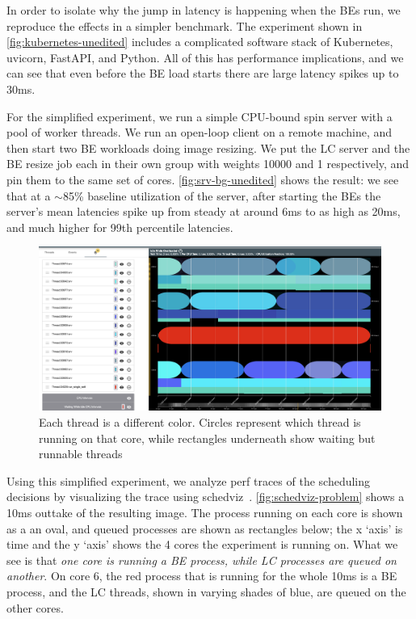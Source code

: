 In order to isolate why the jump in latency is happening when the BEs run, we
reproduce the effects in a simpler benchmark. The experiment shown in
\autoref{fig:kubernetes-unedited} includes a complicated software stack of
Kubernetes, uvicorn, FastAPI, and Python. All of this has performance
implications, and we can see that even before the BE load starts there are large
latency spikes up to 30ms.

For the simplified experiment, we run a simple CPU-bound spin server with a pool
of worker threads. We run an open-loop client on a remote machine, and then
start two BE workloads doing image resizing. We put the LC server and the BE
resize job each in their own \cgroups{} group with weights 10000 and 1
respectively, and pin them to the same set of cores.
\autoref{fig:srv-bg-unedited} shows the result: we see that at a $\sim$85\%
baseline utilization of the server, after starting the BEs the server's mean
latencies spike up from steady at around 6ms to as high as 20ms, and much higher
for 99th percentile latencies.

\begin{figure}[t]
    \centering
    \includegraphics[width=\columnwidth]{graphs/schedviz-problem.png}
    \caption{Each thread is a different color. Circles represent which
    thread is running on that core, while rectangles underneath show waiting but
    runnable threads
    }\label{fig:schedviz-problem}
\end{figure}

Using this simplified experiment, we analyze perf traces of the scheduling
decisions by visualizing the trace using schedviz~\cite{schedviz-tool}.
\autoref{fig:schedviz-problem} shows a 10ms outtake of the resulting image. The
process running on each core is shown as a an oval, and queued processes are
shown as rectangles below; the x `axis' is time and the y `axis' shows the 4
cores the experiment is running on. What we see is that \textit{one core is
running a BE process, while LC processes are queued on another}. On core 6, the
red process that is running for the whole 10ms is a BE process, and the LC threads,
shown in varying shades of blue, are queued on the other cores.

